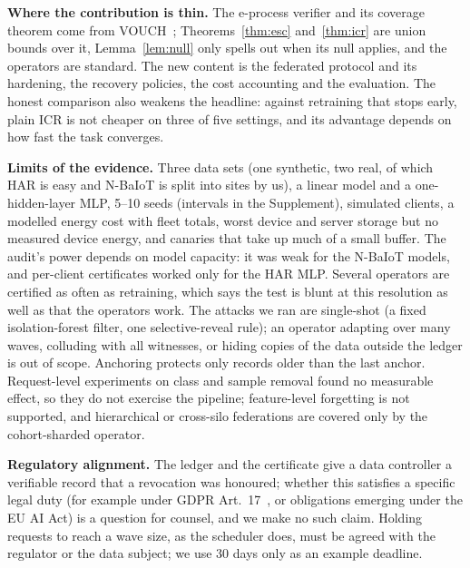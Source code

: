 \documentclass[journal]{IEEEtran}
\begin{document}
\textbf{Where the contribution is thin.} The e-process verifier and its coverage theorem come from VOUCH~\cite{dang2026vouch}; Theorems~\ref{thm:esc} and~\ref{thm:icr} are union bounds over it, Lemma~\ref{lem:null} only spells out when its null applies, and the operators are standard. The new content is the federated protocol and its hardening, the recovery policies, the cost accounting and the evaluation. The honest comparison also weakens the headline: against retraining that stops early, plain ICR is not cheaper on three of five settings, and its advantage depends on how fast the task converges.

\textbf{Limits of the evidence.} Three data sets (one synthetic, two real, of which HAR is easy and N-BaIoT is split into sites by us), a linear model and a one-hidden-layer MLP, 5--10 seeds (intervals in the Supplement), simulated clients, a modelled energy cost with fleet totals, worst device and server storage but no measured device energy, and canaries that take up much of a small buffer. The audit's power depends on model capacity: it was weak for the N-BaIoT models, and per-client certificates worked only for the HAR MLP. Several operators are certified as often as retraining, which says the test is blunt at this resolution as well as that the operators work. The attacks we ran are single-shot (a fixed isolation-forest filter, one selective-reveal rule); an operator adapting over many waves, colluding with all witnesses, or hiding copies of the data outside the ledger is out of scope. Anchoring protects only records older than the last anchor. Request-level experiments on class and sample removal found no measurable effect, so they do not exercise the pipeline; feature-level forgetting is not supported, and hierarchical or cross-silo federations are covered only by the cohort-sharded operator.

\textbf{Regulatory alignment.} The ledger and the certificate give a data controller a verifiable record that a revocation was honoured; whether this satisfies a specific legal duty (for example under GDPR Art.~17~\cite{gdpr}, or obligations emerging under the EU AI Act) is a question for counsel, and we make no such claim. Holding requests to reach a wave size, as the scheduler does, must be agreed with the regulator or the data subject; we use 30 days only as an example deadline.
\end{document}
